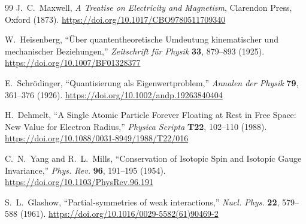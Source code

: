 \documentclass[%
 reprint,
 amsmath,amssymb,
 aps,
]{revtex4-1}
\numberwithin{equation}{section}%
\begin{document}
\begin{thebibliography}{99}
J.~C.~Maxwell, 
\textit{A Treatise on Electricity and Magnetism}, 
Clarendon Press, Oxford (1873).
\href{https://doi.org/10.1017/CBO9780511709340}{https://doi.org/10.1017/CBO9780511709340}

W.~Heisenberg, 
``Über quantentheoretische Umdeutung kinematischer und mechanischer Beziehungen,'' 
\textit{Zeitschrift für Physik} \textbf{33}, 879--893 (1925).
\href{https://doi.org/10.1007/BF01328377}{https://doi.org/10.1007/BF01328377}

E.~Schrödinger, 
``Quantisierung als Eigenwertproblem,'' 
\textit{Annalen der Physik} \textbf{79}, 361--376 (1926).
\href{https://doi.org/10.1002/andp.19263840404}{https://doi.org/10.1002/andp.19263840404}

H.~Dehmelt, 
``A Single Atomic Particle Forever Floating at Rest in Free Space: New Value for Electron Radius,'' 
\textit{Physica Scripta} \textbf{T22}, 102--110 (1988).
\href{https://doi.org/10.1088/0031-8949/1988/T22/016}{https://doi.org/10.1088/0031-8949/1988/T22/016}

C.~N.~Yang and R.~L.~Mills, 
``Conservation of Isotopic Spin and Isotopic Gauge Invariance,'' 
\textit{Phys. Rev.} \textbf{96}, 191--195 (1954).
\href{https://doi.org/10.1103/PhysRev.96.191}{https://doi.org/10.1103/PhysRev.96.191}

S.~L.~Glashow, 
``Partial-symmetries of weak interactions,'' 
\textit{Nucl. Phys.} \textbf{22}, 579--588 (1961).
\href{https://doi.org/10.1016/0029-5582(61)90469-2}{https://doi.org/10.1016/0029-5582(61)90469-2}


\end{thebibliography}
\end{document}
